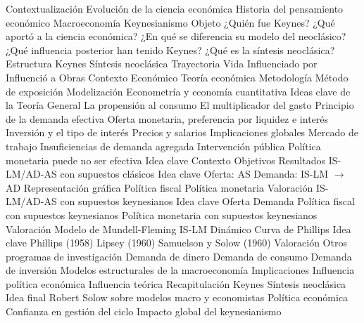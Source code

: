 \documentclass{nuevotema}
\begin{document}
\begin{esquema}[enumerate]
	\1[] 
		\2 Contextualización
			\3 Evolución de la ciencia económica
			\3 Historia del pensamiento económico
			\3 Macroeconomía
			\3 Keynesianismo
		\2 Objeto
			\3 ¿Quién fue Keynes?
			\3 ¿Qué aportó a la ciencia económica?
			\3 ¿En qué se diferencia su modelo del neoclásico?
			\3 ¿Qué influencia posterior han tenido Keynes?
			\3 ¿Qué es la síntesis neoclásica?
		\2 Estructura
			\3 Keynes
			\3 Síntesis neoclásica
	\1 
		\2 Trayectoria
			\3 Vida
			\3 Influenciado por
			\3 Influenció a
			\3 Obras
		\2 Contexto
			\3 Económico
			\3 Teoría económica
		\2 Metodología
			\3 Método de exposición
			\3 Modelización
			\3 Econometría y economía cuantitativa
		\2 Ideas clave de la Teoría General
			\3 La propensión al consumo
			\3 El multiplicador del gasto
			\3 Principio de la demanda efectiva
			\3 Oferta monetaria, preferencia por liquidez e interés
			\3 Inversión y el tipo de interés
			\3 Precios y salarios
		\2 Implicaciones globales
			\3 Mercado de trabajo
			\3 Insuficiencias de demanda agregada
			\3 Intervención pública
			\3 Política monetaria puede no ser efectiva
	\1 
		\2 Idea clave
			\3 Contexto
			\3 Objetivos
			\3 Resultados
		\2 IS-LM/AD-AS con supuestos clásicos
			\3 Idea clave
			\3 Oferta: AS
			\3 Demanda: IS-LM $\to$ AD
			\3 Representación gráfica
			\3 Política fiscal
			\3 Política monetaria
			\3 Valoración
		\2 IS-LM/AD-AS con supuestos keynesianos
			\3 Idea clave
			\3 Oferta
			\3 Demanda
			\3 Política fiscal con supuestos keynesianos
			\3 Política monetaria con supuestos keynesianos
			\3 Valoración
			\3 Modelo de Mundell-Fleming
			\3 IS-LM Dinámico
		\2 Curva de Phillips
			\3 Idea clave
			\3 Phillips (1958)
			\3 Lipsey (1960)
			\3 Samuelson y Solow (1960)
			\3 Valoración
		\2 Otros programas de investigación
			\3 Demanda de dinero
			\3 Demanda de consumo
			\3 Demanda de inversión
			\3 Modelos estructurales de la macroeconomía
		\2 Implicaciones
			\3 Influencia política económica
			\3 Influencia teórica
	\1[] 
		\2 Recapitulación
			\3 Keynes
			\3 Síntesis neoclásica
		\2 Idea final
			\3 Robert Solow sobre modelos macro y economistas
			\3 Política económica
			\3 Confianza en gestión del ciclo
			\3 Impacto global del keynesianismo

\end{esquema}

\esquemalargo
\end{document}

